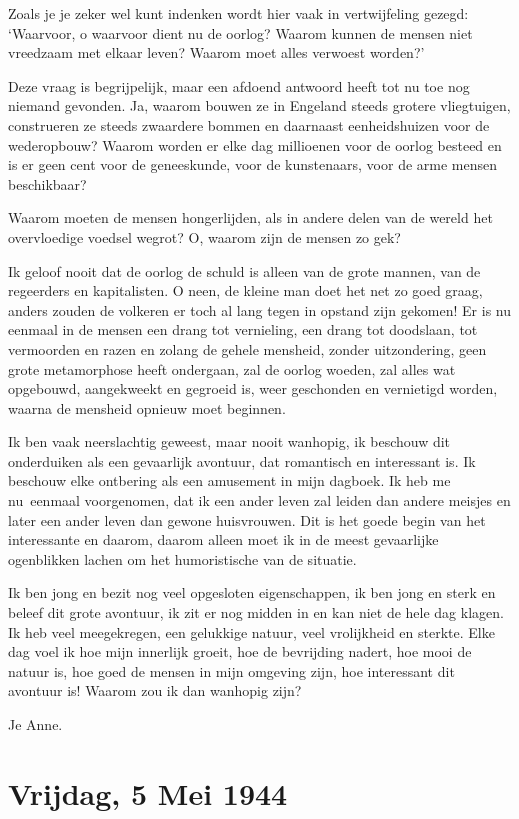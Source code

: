 \documentclass{book}
\begin{document}
Zoals je je zeker wel kunt indenken wordt hier vaak in vertwijfeling gezegd:
`Waarvoor, o waarvoor dient nu de oorlog? Waarom kunnen de mensen niet vreedzaam
met elkaar leven? Waarom moet alles verwoest worden?'

Deze vraag is begrijpelijk, maar een afdoend antwoord heeft tot nu toe nog
niemand gevonden. Ja, waarom bouwen ze in Engeland steeds grotere vliegtuigen,
construeren ze steeds zwaardere bommen en daarnaast eenheidshuizen voor de
wederopbouw? Waarom worden er elke dag millioenen voor de oorlog besteed en is
er geen cent voor de geneeskunde, voor de kunstenaars, voor de arme mensen
beschikbaar?

Waarom moeten de mensen hongerlijden, als in andere delen van de wereld het
overvloedige voedsel wegrot? O, waarom zijn de mensen zo gek?

Ik geloof nooit dat de oorlog de schuld is alleen van de grote mannen, van de
regeerders en kapitalisten. O neen, de kleine man doet het net zo goed graag,
anders zouden de volkeren er toch al lang tegen in opstand zijn gekomen! Er is
nu eenmaal in de mensen een drang tot vernieling, een drang tot doodslaan, tot
vermoorden en razen en zolang de gehele mensheid, zonder uitzondering, geen
grote metamorphose heeft ondergaan, zal de oorlog woeden, zal alles wat
opgebouwd, aangekweekt en gegroeid is, weer geschonden en vernietigd worden,
waarna de mensheid opnieuw moet beginnen.

Ik ben vaak neerslachtig geweest, maar nooit wanhopig, ik beschouw dit
onderduiken als een gevaarlijk avontuur, dat romantisch en interessant is. Ik
beschouw elke ontbering als een amusement in mijn dagboek. Ik heb me nu~eenmaal
voorgenomen, dat ik een ander leven zal leiden dan andere meisjes en later een
ander leven dan gewone huisvrouwen. Dit is het goede begin van het interessante
en daarom, daarom alleen moet ik in de meest gevaarlijke ogenblikken lachen om
het humoristische van de situatie.

Ik ben jong en bezit nog veel opgesloten eigenschappen, ik ben jong en sterk en
beleef dit grote avontuur, ik zit er nog midden in en kan niet de hele dag
klagen. Ik heb veel meegekregen, een gelukkige natuur, veel vrolijkheid en
sterkte. Elke dag voel ik hoe mijn innerlijk groeit, hoe de bevrijding nadert,
hoe mooi de natuur is, hoe goed de mensen in mijn omgeving zijn, hoe interessant
dit avontuur is! Waarom zou ik dan wanhopig zijn?

Je Anne.

\section*{Vrijdag, 5 Mei 1944}
\end{document}
